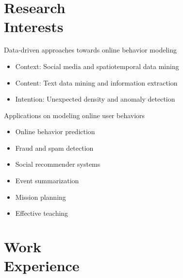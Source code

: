 \documentclass[margin, 9pt]{res}
\begin{document}
\begin{resume}

\section{Research \\ Interests}

Data-driven approaches towards online behavior modeling
\vspace{0.03in}
\begin{itemize}
\item Context: Social media and spatiotemporal data mining
\item Content: Text data mining and information extraction
\item Intention: Unexpected density and anomaly detection
\end{itemize}
\vspace{-0.1in}
Applications on modeling online user behaviors
\vspace{-0.12in}
\begin{multicols}{2}
\begin{itemize}
\item Online behavior prediction
\item Fraud and spam detection
\item Social recommender systems
\item Event summarization
\item Mission planning
\item Effective teaching
\end{itemize}
\end{multicols}


\section{Work \\ Experience}


\end{resume}
\end{document}
